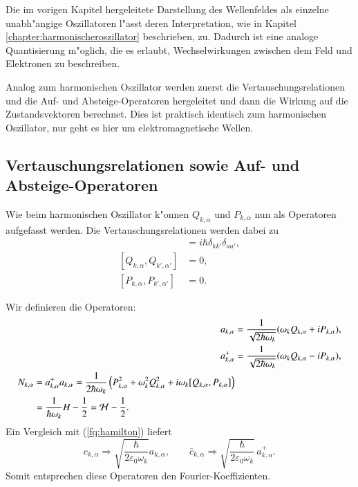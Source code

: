 \begin{refsection}
Die im vorigen Kapitel hergeleitete Darstellung des Wellenfeldes als einzelne unabh"angige Oszillatoren l"asst deren Interpretation, wie in Kapitel \ref{chapter:harmonischeroszillator} beschrieben, zu. Dadurch ist eine analoge Quantisierung m"oglich, die es erlaubt, Wechselwirkungen zwischen dem Feld und Elektronen zu beschreiben.

Analog zum harmonischen Oszillator werden zuerst die Vertauschungsrelationen und die Auf- und Absteige-Operatoren hergeleitet und dann die Wirkung auf die Zustandsvektoren berechnet. Dies ist praktisch identisch zum harmonischen Oszillator, nur geht es hier um elektromagnetische Wellen.

\subsection{Vertauschungsrelationen sowie Auf- und Absteige-Operatoren}
Wie beim harmonischen Oszillator k"onnen $Q_{k,\alpha}$ und $P_{k,\alpha}$ nun als Operatoren aufgefasst werden. Die Vertauschungsrelationen werden dabei zu
\begin{align*}
[Q_{k,\alpha}, P_{k',\alpha'}] &= i \hbar \delta_{kk'}\delta_{aa'}, \\
[Q_{k,\alpha}, Q_{k',\alpha'}] &= 0, \\
[P_{k,\alpha}, P_{k',\alpha'}] &= 0.
\end{align*}

Wir definieren die Operatoren:
\begin{align*}
a_{k,\alpha} &= \frac{1}{\sqrt{2 \hbar \omega_k}} (\omega_k Q_{k,\alpha} + iP_{k,\alpha}), \\
a^+_{k,\alpha} &= \frac{1}{\sqrt{2 \hbar \omega_k}} (\omega_k Q_{k,\alpha} - iP_{k,\alpha}),\\
\begin{split}
N_{k,\alpha} &= a^+_{k,\alpha} a_{k,\alpha} = \frac{1}{2 \hbar \omega_k} \left(P_{k,\alpha}^2 + \omega_k^2 Q_{k,\alpha}^2 + i\omega_k [Q_{k,\alpha},P_{k,\alpha}] \right) \\
 &= \frac{1}{ \hbar \omega_k } H - \frac{1}{2} = {\cal H} - \frac{1}{2}.
\end{split}
\end{align*}
Ein Vergleich mit (\ref{fq:hamilton}) liefert
\begin{equation} \label{fq:opp_fourier}
 c_{k,\alpha} \Rightarrow \sqrt{\frac{\hbar}{2 \varepsilon_0 \omega_k}} a_{k,\alpha}, \qquad 
 \bar{c}_{k,\alpha} \Rightarrow \sqrt{\frac{\hbar}{2 \varepsilon_0 \omega_k}} \, a^+_{k,\alpha}.
\end{equation}
Somit entsprechen diese Operatoren den Fourier-Koeffizienten.


\end{refsection}

